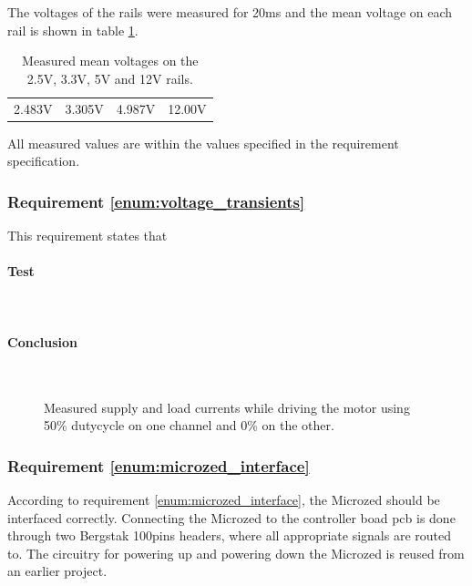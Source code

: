 The voltages of the rails were measured for 20ms and the mean voltage on each rail is shown in table \ref{tab:meas_rails}.
\begin{table}[]
\centering
\begin{tabular}{|l|l|l|l|}
\hline
2.483V & 3.305V & 4.987V & 12.00V
\end{tabular}
\caption{Measured mean voltages on the 2.5V, 3.3V, 5V and 12V rails.}
\label{tab:meas_rails}
\end{table}
All measured values are within the values specified in the requirement specification.


\subsubsection{Requirement \ref{enum:voltage_transients}} %
\label{ssub:requirement_enum:voltage_transients}
This requirement states that

\paragraph{Test}~\\

\paragraph{Conclusion}~\\
\begin{figure}[h]
	\centering
    
	\caption[Measured supply and load currents.]{Measured supply and load currents while driving the motor using 50\% dutycycle on one channel and 0\% on the other.}
	\label{fig:controllerboardv2_}
\end{figure}

\subsubsection{Requirement \ref{enum:microzed_interface}} %
\label{ssub:requirement_enum:microzed_interface}
According to requirement  \ref{enum:microzed_interface}, the Microzed should be interfaced correctly.
Connecting the Microzed to the controller boad pcb is done through two Bergstak 100pins headers, where all appropriate signals are routed to.
The circuitry for powering up and powering down the Microzed is reused from an earlier project.


